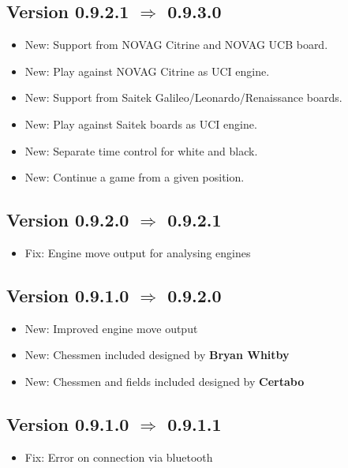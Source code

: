 \documentclass[11pt,a4paper]{article}
\begin{document}
\subsection*{Version 0.9.2.1 $\Rightarrow$  0.9.3.0}
\begin{itemize}
	\item {\color{blue}New}: Support from NOVAG Citrine and NOVAG UCB board.
	\item {\color{blue}New}: Play against NOVAG Citrine as UCI engine.
	\item {\color{blue}New}: Support from Saitek Galileo/Leonardo/Renaissance boards.
	\item {\color{blue}New}: Play against Saitek boards as UCI engine.
	\item {\color{blue}New}: Separate time control for white and black.
	\item {\color{blue}New}: Continue a game from a given position.
\end{itemize}

\subsection*{Version 0.9.2.0 $\Rightarrow$  0.9.2.1}
\begin{itemize}
	\item {\color{red}Fix}: Engine move output for analysing engines
\end{itemize}

\subsection*{Version 0.9.1.0 $\Rightarrow$  0.9.2.0}
\begin{itemize}
	\item {\color{blue}New}: Improved engine move output
	\item {\color{blue}New}: Chessmen included designed by \textbf{Bryan Whitby}
	\item {\color{blue}New}: Chessmen and fields included designed by \textbf{Certabo}
\end{itemize}

\subsection*{Version 0.9.1.0 $\Rightarrow$  0.9.1.1}
\begin{itemize}
	\item {\color{red}Fix}: Error on connection via bluetooth 
\end{itemize}
\end{document}
